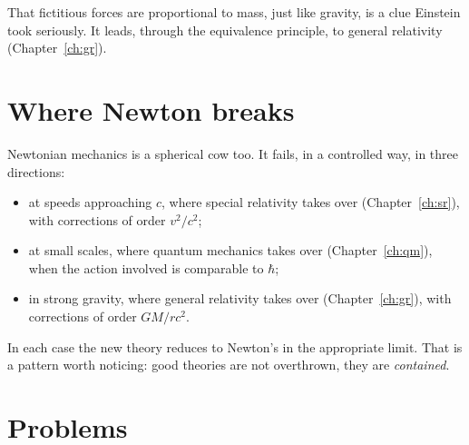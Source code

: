 That fictitious forces are proportional to mass, just like gravity, is a clue Einstein took seriously. It leads, through the equivalence principle, to general relativity (Chapter~\ref{ch:gr}).

\section{Where Newton breaks}

Newtonian mechanics is a spherical cow too. It fails, in a controlled way, in three directions:
\begin{itemize}[itemsep=3pt]
  \item at speeds approaching $c$, where special relativity takes over (Chapter~\ref{ch:sr}), with corrections of order $v^2/c^2$;
  \item at small scales, where quantum mechanics takes over (Chapter~\ref{ch:qm}), when the action involved is comparable to $\hbar$;
  \item in strong gravity, where general relativity takes over (Chapter~\ref{ch:gr}), with corrections of order $GM/rc^2$.
\end{itemize}
In each case the new theory reduces to Newton's in the appropriate limit. That is a pattern worth noticing: good theories are not overthrown, they are \emph{contained}.

\section{Problems}

